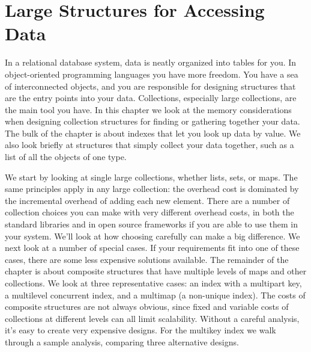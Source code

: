 \chapter{Large Structures for Accessing Data}
\label{chapter:tables-indexes}

In a relational database system, data is neatly organized into tables for you. 
In object-oriented programming languages you have more freedom. You have a sea
of interconnected objects, and you are
responsible for designing structures that are the entry points into your
data.  Collections, especially large collections, are the
main tool you have. In this chapter we look at the memory considerations when
designing collection structures for finding or gathering together your
data. The bulk of the chapter is about indexes that let you look up data by
value. We also look briefly at structures that simply collect your data together, such as
a list of all the objects of one type. 

We start by looking at single large
collections, whether lists, sets, or maps.  The same principles apply in any
large collection: the overhead cost is dominated by the
incremental overhead of adding each new element.  There are a number of
collection choices you can make with very different overhead costs, in both the
standard libraries and in open source frameworks if you are able to use them in your system. We'll look
at how choosing carefully can make a big difference.  We
next look at a number of special cases. If your requirements fit into one of
these cases, there are some less expensive solutions
available. The remainder of the chapter is about composite structures that have
multiple levels of maps and other collections. We look at three representative cases: 
an index with a multipart key, a multilevel concurrent index, and a multimap (a non-unique index). 
The costs of composite structures are not always obvious, since fixed and variable costs of collections
at different levels can all limit scalability. Without a careful analysis, it's easy to create very expensive designs.
For the multikey index we walk through a sample analysis, comparing
three alternative designs.



